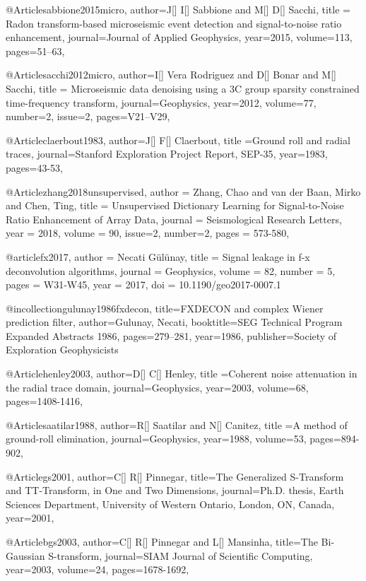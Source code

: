 @Article{sabbione2015micro,
  author={J[] I[] Sabbione and M[] D[] Sacchi},
  title = {Radon transform-based microseismic event detection and signal-to-noise ratio enhancement},
  journal={Journal of Applied Geophysics},
  year=2015,
volume=113,
  pages={51–63},
}

@Article{sacchi2012micro,
  author={I[] Vera Rodriguez and D[] Bonar and M[] Sacchi},
  title = {Microseismic data denoising using a 3C group sparsity constrained time-frequency transform},
  journal={Geophysics},
  year=2012,
volume=77,
number=2,
issue=2,
  pages={V21–V29},
}

@Article{claerbout1983,
  author={J[] F[] Claerbout},
  title ={Ground roll and radial traces},
  journal={Stanford Exploration Project Report, SEP-35},
  year=1983,
  pages={43-53},
}

@Article{zhang2018unsupervised,
  author = 	 {Zhang, Chao and van der Baan, Mirko and Chen, Ting},
  title = 	 {Unsupervised Dictionary Learning for Signal-to-Noise Ratio Enhancement of Array Data},
  journal = 	 {Seismological Research Letters},
  year = 	 2018,
  volume =	 90,
  issue=2,
  number=2,
  pages =	 {573-580},
}

@article{fx2017, 
author = {Necati Gülünay}, 
title = {Signal leakage in f-x deconvolution algorithms}, journal = {Geophysics}, volume = {82}, number = {5}, pages = {W31-W45}, year = {2017}, 
doi = {10.1190/geo2017-0007.1}
}   

@incollection{gulunay1986fxdecon,
  title={FXDECON and complex Wiener prediction filter},
  author={Gulunay, Necati},
  booktitle={SEG Technical Program Expanded Abstracts 1986},
  pages={279--281},
  year={1986},
  publisher={Society of Exploration Geophysicists}
}


@Article{henley2003,
  author={D[] C[] Henley},
  title ={Coherent noise attenuation in the radial trace domain},
  journal={Geophysics},
  year=2003,
  volume=68,
  pages={1408-1416},
}

@Article{saatilar1988,
  author={R[] Saatilar and N[] Canitez},
  title ={A method of ground-roll elimination},
  journal={Geophysics},
  year=1988,
  volume=53,
  pages={894-902},
}

@Article{gs2001,
  author={C[] R[] Pinnegar},
  title={The Generalized S-Transform and TT-Transform, in One and Two Dimensions},
  journal={Ph.D. thesis, Earth Sciences Department, University of Western Ontario, London,
ON, Canada},
  year=2001,
}

@Article{bgs2003,
  author={C[] R[] Pinnegar and L[] Mansinha},
  title={The {B}i-{G}aussian {S}-transform},
  journal={SIAM Journal of Scientific Computing},
  year=2003,
  volume=24,
  pages={1678-1692},
}

